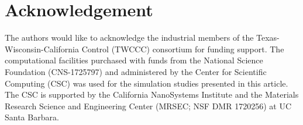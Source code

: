 \documentclass[preprint,5p, twocolumn, authoryear]{elsarticle}
\begin{document}
\section*{Acknowledgement}
The authors would like to acknowledge the industrial
members of the Texas-Wisconsin-California Control (TWCCC)
consortium for funding support.
The computational facilities purchased with funds from the National Science Foundation (CNS-1725797) 
and administered by the Center for Scientific Computing (CSC) was used for the simulation 
studies presented in this article. 
The CSC is supported by the California NanoSystems 
Institute and the Materials Research Science and Engineering Center 
(MRSEC; NSF DMR 1720256) at UC Santa Barbara.



\end{document}
